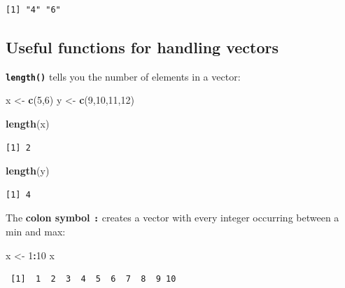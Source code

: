 \documentclass[
]{book}
\newenvironment{Shaded}{\begin{snugshade}}{\end{snugshade}}
\newcommand{\DecValTok}[1]{\textcolor[rgb]{0.00,0.00,0.81}{#1}}
\newcommand{\KeywordTok}[1]{\textcolor[rgb]{0.13,0.29,0.53}{\textbf{#1}}}
\newcommand{\NormalTok}[1]{#1}
\newcommand{\OperatorTok}[1]{\textcolor[rgb]{0.81,0.36,0.00}{\textbf{#1}}}
\newcommand{\StringTok}[1]{\textcolor[rgb]{0.31,0.60,0.02}{#1}}
\begin{document}
\begin{verbatim}
[1] "4" "6"
\end{verbatim}

\hypertarget{useful-functions-for-handling-vectors}{%
\subsection*{Useful functions for handling vectors}\label{useful-functions-for-handling-vectors}}

\textbf{\texttt{length()}} tells you the number of elements in a vector:

\begin{Shaded}
\begin{Highlighting}[]
\NormalTok{x <-}\StringTok{ }\KeywordTok{c}\NormalTok{(}\DecValTok{5}\NormalTok{,}\DecValTok{6}\NormalTok{)}
\NormalTok{y <-}\StringTok{ }\KeywordTok{c}\NormalTok{(}\DecValTok{9}\NormalTok{,}\DecValTok{10}\NormalTok{,}\DecValTok{11}\NormalTok{,}\DecValTok{12}\NormalTok{)}

\KeywordTok{length}\NormalTok{(x)}
\end{Highlighting}
\end{Shaded}

\begin{verbatim}
[1] 2
\end{verbatim}

\begin{Shaded}
\begin{Highlighting}[]
\KeywordTok{length}\NormalTok{(y)}
\end{Highlighting}
\end{Shaded}

\begin{verbatim}
[1] 4
\end{verbatim}

The \textbf{colon symbol \texttt{:}} creates a vector with every integer occurring between a min and max:

\begin{Shaded}
\begin{Highlighting}[]
\NormalTok{x <-}\StringTok{ }\DecValTok{1}\OperatorTok{:}\DecValTok{10}
\NormalTok{x}
\end{Highlighting}
\end{Shaded}

\begin{verbatim}
 [1]  1  2  3  4  5  6  7  8  9 10
\end{verbatim}
\end{document}
